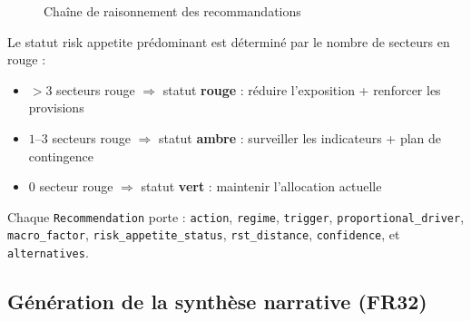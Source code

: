 \documentclass[12pt,a4paper]{article}
\begin{document}
\begin{figure}[htbp]
\centering
{}
\caption{Cha\^ine de raisonnement des recommandations}
\label{fig:reco_chain}
\end{figure}

Le statut risk appetite pr\'edominant est d\'etermin\'e par le nombre de secteurs en rouge :

\begin{itemize}[nosep]
    \item $> 3$ secteurs rouge $\Rightarrow$ statut \textcolor{accentred}{\textbf{rouge}} :
          r\'eduire l'exposition + renforcer les provisions
    \item $1$--$3$ secteurs rouge $\Rightarrow$ statut \textcolor{accentorange}{\textbf{ambre}} :
          surveiller les indicateurs + plan de contingence
    \item $0$ secteur rouge $\Rightarrow$ statut \textcolor{accentgreen}{\textbf{vert}} :
          maintenir l'allocation actuelle
\end{itemize}

Chaque \texttt{Recommendation} porte :
\texttt{action}, \texttt{regime}, \texttt{trigger}, \texttt{proportional\_driver},
\texttt{macro\_factor}, \texttt{risk\_appetite\_status}, \texttt{rst\_distance},
\texttt{confidence}, et \texttt{alternatives}.

\subsection{G\'en\'eration de la synth\`ese narrative (FR32)}
\end{document}
